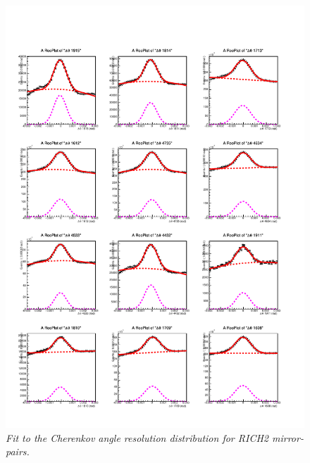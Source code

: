 \begin{figure}[!h]
	\vspace*{-0.cm}
	\begin{center}
		\includegraphics[width=1.\textwidth]{rich2_p3.pdf}
		\vspace*{-1.5cm}
	\end{center}
	\caption{\textit{Fit to the Cherenkov angle resolution distribution for RICH2 mirror-pairs.}}
	\label{fig:rich2p3}
\end{figure}
\clearpage

